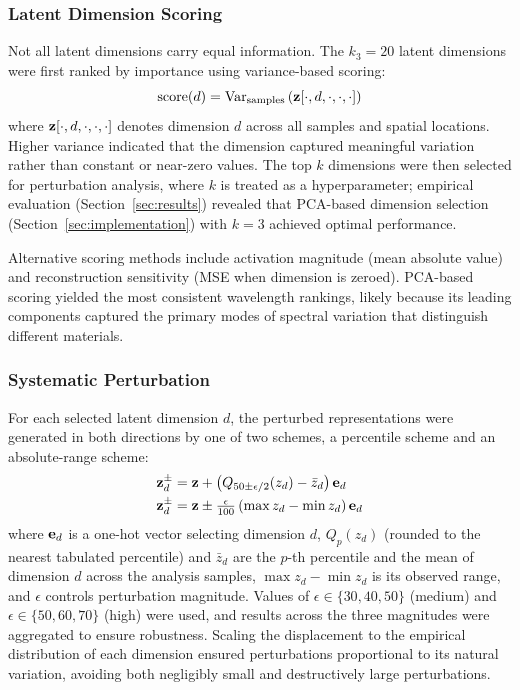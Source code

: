 \subsubsection{Latent Dimension Scoring}
Not all latent dimensions carry equal information.
The $k_3 = 20$ latent dimensions were first ranked by importance using variance-based scoring:
\begin{equation}
\text{score}(d) = \text{Var}_{\text{samples}}\left(\mathbf{z}[\cdot, d, \cdot, \cdot, \cdot]\right)
\label{eq:dim_score}
\end{equation}
where $\mathbf{z}[\cdot, d, \cdot, \cdot, \cdot]$ denotes dimension $d$ across all samples and spatial locations.
Higher variance indicated that the dimension captured meaningful variation rather than constant or near-zero values.
The top $k$ dimensions were then selected for perturbation analysis, where $k$ is treated as a hyperparameter; empirical evaluation (Section~\ref{sec:results}) revealed that PCA-based dimension selection (Section~\ref{sec:implementation}) with $k = 3$ achieved optimal performance.

Alternative scoring methods include activation magnitude (mean absolute value) and reconstruction sensitivity (MSE when dimension is zeroed).
PCA-based scoring yielded the most consistent wavelength rankings, likely because its leading components captured the primary modes of spectral variation that distinguish different materials.

\subsubsection{Systematic Perturbation}
For each selected latent dimension $d$, the perturbed representations were generated in both directions by one of two schemes, a percentile scheme and an absolute-range scheme:
\begin{align}
\mathbf{z}^{\pm}_d &= \mathbf{z} + \left( Q_{50 \pm \epsilon/2}(z_d) - \bar{z}_d \right) \mathbf{e}_d \label{eq:perturb_pos}\\
\mathbf{z}^{\pm}_d &= \mathbf{z} \pm \tfrac{\epsilon}{100} \left( \max z_d - \min z_d \right) \mathbf{e}_d \label{eq:perturb_neg}
\end{align}
where $\mathbf{e}_d$ is a one-hot vector selecting dimension $d$, $Q_p(z_d)$ (rounded to the nearest tabulated percentile) and $\bar{z}_d$ are the $p$-th percentile and the mean of dimension $d$ across the analysis samples, $\max z_d - \min z_d$ is its observed range, and $\epsilon$ controls perturbation magnitude.
Values of $\epsilon \in \{30, 40, 50\}$ (medium) and $\epsilon \in \{50, 60, 70\}$ (high) were used, and results across the three magnitudes were aggregated to ensure robustness.
Scaling the displacement to the empirical distribution of each dimension ensured perturbations proportional to its natural variation, avoiding both negligibly small and destructively large perturbations.


